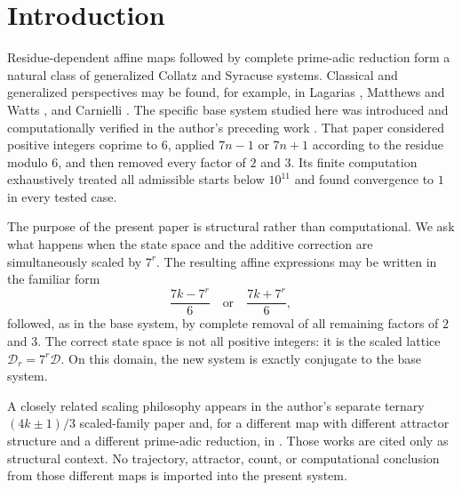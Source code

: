 \documentclass[11pt]{article}
\begin{document}
\begin{abstract}
A crucial domain qualification is proved explicitly: the identity $T_r(7^rn)=7^rT_0(n)$ is a conjugacy on $\mathcal D_r=7^r\mathcal D$; it is generally false if one applies the affine expression $(7k\pm7^r)/6$ to arbitrary $k$ outside the scaled domain. Finally, global convergence for any one scaled level is equivalent to global convergence of the base map. Thus scaling neither creates a new global convergence problem nor solves the unresolved base problem.
\end{abstract}

\section{Introduction}
Residue-dependent affine maps followed by complete prime-adic reduction form a natural class of generalized Collatz and Syracuse systems. Classical and generalized perspectives may be found, for example, in Lagarias \cite{Lagarias1985}, Matthews and Watts \cite{MatthewsWatts1985}, and Carnielli \cite{Carnielli2015}. The specific base system studied here was introduced and computationally verified in the author's preceding work \cite{Base7Paper}. That paper considered positive integers coprime to $6$, applied $7n-1$ or $7n+1$ according to the residue modulo $6$, and then removed every factor of $2$ and $3$. Its finite computation exhaustively treated all admissible starts below $10^{11}$ and found convergence to $1$ in every tested case.

The purpose of the present paper is structural rather than computational. We ask what happens when the state space and the additive correction are simultaneously scaled by $7^r$. The resulting affine expressions may be written in the familiar form
\[
\frac{7k-7^r}{6}\quad\text{or}\quad\frac{7k+7^r}{6},
\]
followed, as in the base system, by complete removal of all remaining factors of $2$ and $3$. The correct state space is not all positive integers: it is the scaled lattice $\mathcal D_r=7^r\mathcal D$. On this domain, the new system is exactly conjugate to the base system.

A closely related scaling philosophy appears in the author's separate ternary $(4k\pm1)/3$ scaled-family paper \cite{Scaled4Paper} and, for a different map with different attractor structure and a different prime-adic reduction, in \cite{Scaled6Paper}. Those works are cited only as structural context. No trajectory, attractor, count, or computational conclusion from those different maps is imported into the present system.
\end{document}
